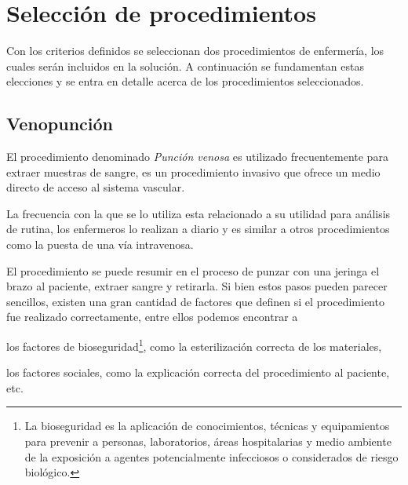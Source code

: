 \section{Selección de procedimientos}
\label{sec:seleccion_escenas}

Con los criterios definidos se seleccionan dos procedimientos
de enfermería, los cuales serán incluidos en la solución. A continuación se
fundamentan estas elecciones y se entra en detalle acerca de los
procedimientos seleccionados.


\subsection{Venopunción}
\label{sec:hemocultivo}

El procedimiento denominado \emph{Punción venosa} es utilizado frecuentemente
para extraer muestras de sangre, es un procedimiento invasivo que ofrece un
medio directo de acceso al sistema vascular. 

La frecuencia con la que se lo utiliza esta relacionado a su utilidad para
análisis de rutina, los enfermeros lo realizan a diario y es similar a otros
procedimientos como la puesta de una vía intravenosa.

El procedimiento se puede resumir en el proceso de punzar con una jeringa el
brazo al paciente, extraer sangre y retirarla. Si bien estos pasos pueden
parecer sencillos, existen una gran cantidad de factores que definen si el
procedimiento fue realizado correctamente, entre ellos podemos encontrar a
\begin{enumerate*}[label=\itshape\alph*\upshape)]
    \item los factores de bioseguridad\footnote{La bioseguridad es la aplicación de
    conocimientos, técnicas y equipamientos para prevenir a personas,
    laboratorios, áreas hospitalarias y medio ambiente de la exposición a
    agentes potencialmente infecciosos o considerados de riesgo
    biológico\cite{world2005manual}.}, como la esterilización correcta de los
	materiales,
    \item los factores sociales, como la explicación correcta del procedimiento al
	paciente, etc.
\end{enumerate*}

